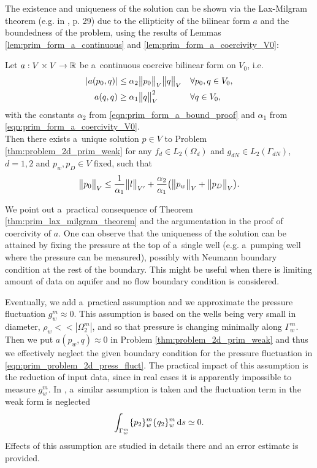The existence and uniqueness of the solution can be shown via the Lax-Milgram theorem (e.g. in \cite{necas_direct_2012}, p. 29) due to the ellipticity
of the bilinear form $a$ and the boundedness of the problem, using the results of Lemmas \ref{lem:prim_form_a_continuous}
and \ref{lem:prim_form_a_coercivity_V0}:
\begin{theorem} \label{thm:prim_lax_milgram_theorem}
Let $a: V\times V \rightarrow \mathbb{R}$ be a~continuous coercive bilinear form on $V_0$, i.e.
\begin{align}
    \left|a(p_0,q)\right| &\leq \alpha_2 \bigl\Vert p_0\bigr\Vert_V \bigl\Vert q\bigr\Vert_V && \forall p_0,q \in V_0,\\
    a(q,q) &\geq \alpha_1 \bigl\Vert q\bigr\Vert^2_V && \forall q\in V_0,
\end{align}
with the constants $\alpha_2$ from \eqref{eqn:prim_form_a_bound_proof} and $\alpha_1$ from \eqref{eqn:prim_form_a_coercivity_V0}.\\
Then there exists a~unique solution $p\in V$ to Problem \eqref{thm:problem_2d_prim_weak} for any
$f_d\in L_2(\Omega_d)$ and $g_{dN}\in L_2(\Gamma_{dN})$, $d=1,2$ and $p_w, p_D\in V$ fixed, such that
\begin{equation}
    \bigl\Vert p_0\bigr\Vert_V \leq \frac{1}{\alpha_1} \bigl\Vert l\bigr\Vert_{V'} + \frac{\alpha_2}{\alpha_1}\big( \bigl\Vert p_w\bigr\Vert_V+\bigl\Vert p_D\bigr\Vert_V \big).
\end{equation}
\end{theorem}

%
We point out a~practical consequence of Theorem \ref{thm:prim_lax_milgram_theorem} and the argumentation in the proof of coercivity of $a$.
One can observe that the uniqueness of the solution can be attained by fixing the pressure at the top of a~single well
(e.g. a~pumping well where the pressure can be measured), possibly with Neumann boundary condition at the rest of the boundary.
This might be useful when there is limiting amount of data on aquifer and no flow boundary condition is considered.

Eventually, we add a~practical assumption and we approximate the pressure fluctuation $g^m_w\approx 0$.
This assumption is based on the wells being very small in diameter, $\rho_w << |\Omega^m_2|$,
and so that pressure is changing minimally along $\Gamma^m_w$.
Then we put $a(p_w,q)\approx 0$ in Problem \eqref{thm:problem_2d_prim_weak}
and thus we effectively neglect the given boundary condition for the pressure fluctuation in \eqref{eqn:prim_problem_2d_press_fluct}.
The practical impact of this assumption is the reduction of input data, since in real cases
it is apparently impossible to measure $g^m_w$.
%
In \cite{koppl_vidotto_2018}, a~similar assumption is taken and the fluctuation term in the weak form is neglected
\begin{equation} \label{eqn:well_edge_fluctuation_neglect}
    \int_{\Gamma^m_w} \{p_2\}^m_w\{q_2\}^m_w \,{\rm d} s \simeq 0.
\end{equation}
Effects of this assumption are studied in details there and an error estimate is provided.


